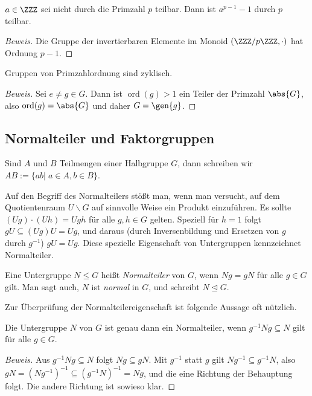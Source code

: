 \documentclass[12pt,a4paper,twoside]{article}
\newcommand{\ei}[1]{\emph{#1}\index{#1}}
\DeclareMathOperator{\ord}{ord}
\begin{document}
\begin{Korollar}
  $a\in\ZZZ$ sei nicht durch die Primzahl $p$ teilbar. Dann ist $a^{p-1}-1$
  durch $p$ teilbar.
\end{Korollar}
\begin{proof}[Beweis]
  Die Gruppe der invertierbaren Elemente im Monoid $(\ZZZ/p\ZZZ,\cdot)$ hat
  Ordnung $p-1$.
\end{proof}
\begin{Korollar}
  Gruppen von Primzahlordnung sind zyklisch.
\end{Korollar}
\begin{proof}[Beweis]
  Sei $e\ne g\in G$. Dann ist $\ord(g)>1$ ein Teiler der Primzahl $\abs{G}$,
  also $\ord(g)=\abs{G}$ und daher $G=\gen{g}$.
\end{proof}
\subsection{Normalteiler und Faktorgruppen}
Sind $A$ und $B$ Teilmengen einer Halbgruppe $G$, dann schreiben wir
$AB:=\{ab|\;a\in A,b\in B\}$.

Auf den Begriff des Normalteilers st\"o\ss t man, wenn man versucht, auf dem
Quotientenraum $U\backslash G$ auf sinnvolle Weise ein Produkt einzuf\"uhren. Es sollte
$(Ug)\cdot(Uh)=Ugh$ f\"ur alle $g,h\in G$ gelten. Speziell f\"ur $h=1$ folgt
$gU\subseteq (Ug)U=Ug$, und daraus (durch Inversenbildung und Ersetzen von $g$
durch $g^{-1}$) $gU=Ug$. Diese spezielle Eigenschaft von Untergruppen
kennzeichnet Normalteiler.
\begin{Definition}
  Eine Untergruppe $N\le G$ hei\ss t \ei{Normalteiler} von $G$, wenn $Ng=gN$
  f\"ur alle $g\in G$ gilt. Man sagt auch, $N$ ist \ei{normal} in $G$, und
  schreibt $N\trianglelefteq G$.
\end{Definition}
Zur \"Uberpr\"ufung der Normalteilereigenschaft ist folgende Aussage oft
n\"utzlich.
\begin{Lemma}\label{L:normalkonj}
  Die Untergruppe $N$ von $G$ ist genau dann ein Normalteiler, wenn
  $g^{-1}Ng\subseteq N$ gilt f\"ur alle $g\in G$.
\end{Lemma}
\begin{proof}[Beweis]
  Aus $g^{-1}Ng\subseteq N$ folgt $Ng\subseteq gN$. Mit $g^{-1}$ statt $g$
  gilt $Ng^{-1}\subseteq g^{-1}N$, also $gN=(Ng^{-1})^{-1}\subseteq
  (g^{-1}N)^{-1}=Ng$, und die eine Richtung der Behauptung folgt. Die andere
  Richtung ist sowieso klar.
\end{proof}
\end{document}
